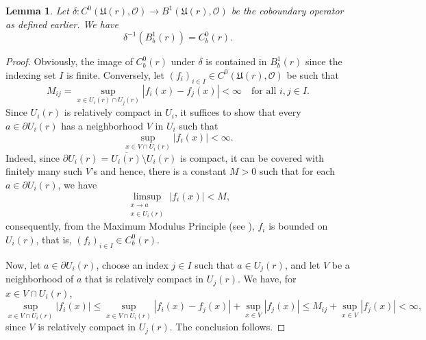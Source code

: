 \documentclass[10pt]{article}
\theoremstyle{thmstyle}
\newtheorem{lemma}[theorem]{Lemma}
\theoremstyle{defstyle}
\newcommand{\frakU}{\mathfrak{U}}
\newcommand{\scrO}{\mathscr{O}} %
\renewcommand{\le}{\leqslant}
\begin{document}
\begin{lemma}
    Let $\delta: C^0(\frakU(r),\scrO)\to B^1(\frakU(r),\scrO)$ be the coboundary operator as defined earlier. We have 
    \begin{equation*}
        \delta^{-1}\left(B^1_b(r)\right) = C^0_b(r).
    \end{equation*}
\end{lemma}
\begin{proof}
    Obviously, the image of $C^0_b(r)$ under $\delta$ is contained in $B^1_b(r)$ since the indexing set $I$ is finite. Conversely, let $(f_i)_{i\in I}\in C^0(\frakU(r), \scrO)$ be such that 
    \begin{equation*}
        M_{ij} = \sup_{x\in U_i(r)\cap U_j(r)} |f_i(x) - f_j(x)| < \infty\quad\text{for all }i,j\in I.
    \end{equation*}
    Since $U_i(r)$ is relatively compact in $U_i$, it suffices to show that every $a\in\partial U_i(r)$ has a neighborhood $V$ in $U_i$ such that 
    \begin{equation*}
        \sup_{x\in V\cap U_i(r)}|f_i(x)| < \infty.
    \end{equation*}
    Indeed, since $\partial U_i(r) = \overline{U_i(r)}\setminus U_i(r)$ is compact, it can be covered with finitely many such $V$'s and hence, there is a constant $M > 0$ such that for each $a\in\partial U_i(r)$, we have 
    \begin{equation*}
        \limsup_{\substack{x\to a\\ x\in U_i(r)}} |f_i(x)| < M,
    \end{equation*}
    consequently, from the Maximum Modulus Principle (see \cite[Theorem VI.1.4]{conway-complex-1}), $f_i$ is bounded on $U_i(r)$, that is, $(f_i)_{i\in I}\in C^0_b(r)$.
    
    Now, let $a\in\partial U_i(r)$, choose an index $j\in I$ such that $a\in U_j(r)$, and let $V$ be a neighborhood of $a$ that is relatively compact in $U_j(r)$. We have, for $x\in V\cap U_i(r)$, 
    \begin{equation*}
        \sup_{x\in V\cap U_i(r)} |f_i(x)|\le\sup_{x\in V\cap U_i(r)}|f_i(x) - f_j(x)| + \sup_{x\in V} |f_j(x)|\le M_{ij} + \sup_{x\in V}|f_j(x)| < \infty,
    \end{equation*}
    since $V$ is relatively compact in $U_j(r)$. The conclusion follows.
\end{proof}
\end{document}
